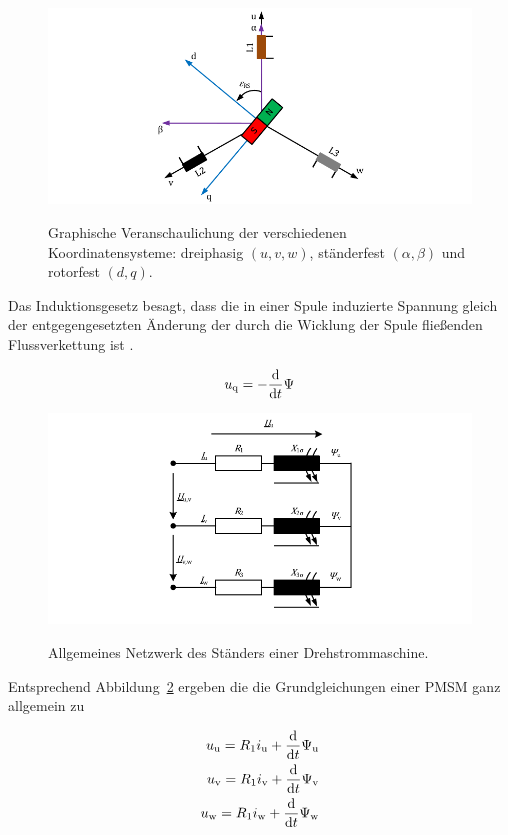 \begin{figure}[h!]
\centering
\includegraphics{_Bilder/synchron-grundlage.pdf}
\label{fig:synchron-grundlage}
\caption{Graphische Veranschaulichung der verschiedenen Koordinatensysteme: dreiphasig $(u,
v, w)$, ständerfest $(\alpha, \beta)$ und rotorfest $(d, q)$.}
\end{figure}

Das Induktionsgesetz besagt, dass die in einer Spule induzierte Spannung gleich der entgegengesetzten Änderung der durch die Wicklung der Spule fließenden Flussverkettung ist \autocite{kellner2012}.

\begin{align}
u_{\mathrm{q}} = - \frac{\mathrm{d}}{\mathrm{d}t}\Psi
\end{align}

\begin{figure}[h!]
\centering
\includegraphics{_Bilder/dq-synchron-rotorfest.pdf}
\label{fig:netzwerk-stander-drehstrom}
\caption{Allgemeines Netzwerk des Ständers einer Drehstrommaschine.}
\end{figure}

Entsprechend Abbildung~\ref{fig:netzwerk-stander-drehstrom} ergeben die die Grundgleichungen einer PMSM ganz allgemein zu

\begin{align}
u_{\mathrm{u}} = R_{\mathrm{1}}i_{\mathrm{u}} + \frac{\mathrm{d}}{\mathrm{d}t}\Psi_{\mathrm{u}} \nonumber \\ 
u_{\mathrm{v}} = R_{\mathrm{1}}i_{\mathrm{v}} + \frac{\mathrm{d}}{\mathrm{d}t}\Psi_{\mathrm{v}} \label{eqn:10} \\ 
u_{\mathrm{w}} = R_{\mathrm{1}}i_{\mathrm{w}} + \frac{\mathrm{d}}{\mathrm{d}t}\Psi_{\mathrm{w}} \nonumber
\end{align}

